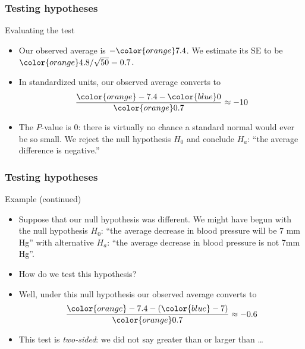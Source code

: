 \documentclass[handout]{beamer}
\begin{document}
   \begin{frame} \frametitle{Testing hypotheses}

   \begin{block}
   {Evaluating  the test}
   \begin{itemize}

   \item Our observed average is ${-\color{orange} 7.4}$. We estimate its SE
   to be ${\color{orange} 4.8 / \sqrt{50}=0.7}$.

    \item In standardized units, our observed average converts to
    $$
    \frac{{\color{orange}-7.4} - {\color{blue} 0}}{\color{orange} 0.7} \approx - 10
    $$

   \item The {\color{orange} $P$-value} is 0: there is virtually no chance
   a standard normal would ever be so small. We reject the null hypothesis $H_0$
   and conclude $H_a$: ``the average difference is negative.''


   \end{itemize}
   \end{block}
   \end{frame}


   \begin{frame} \frametitle{Testing hypotheses}

   \begin{block}
   {Example (continued)}
   \begin{itemize}

   \item Suppose that our null hypothesis was different. We might
   have begun with the null hypothesis $H_0$: ``the average decrease in
   blood pressure will be 7 mm Hg'' with alternative $H_a$: ``the
   average decrease in blood pressure is not 7mm Hg''.

    \item How do we test this hypothesis?

    \item Well, under this null hypothesis our observed average converts to
    $$
    \frac{{\color{orange}-7.4} - ({\color{blue} -7})}{\color{orange} 0.7} \approx -0.6
    $$

    \item This test is {\em two-sided}: we did not say greater
    than or larger than \dots


   \end{itemize}
   \end{block}
   \end{frame}
\end{document}
